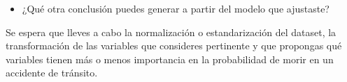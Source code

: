 \documentclass[letterpaper,11pt]{article}
\begin{document}
\begin{enumerate}
\begin{itemize}
        \item ¿Qué otra conclusión puedes generar a partir del modelo que 
        ajustaste? 
    \end{itemize}

    Se espera que lleves a cabo la normalización o estandarización del 
    dataset, la transformación de las variables que consideres pertinente y 
    que propongas qué variables tienen más o menos importancia en la 
    probabilidad de morir en un accidente de tránsito.
\end{enumerate}
\end{document}
